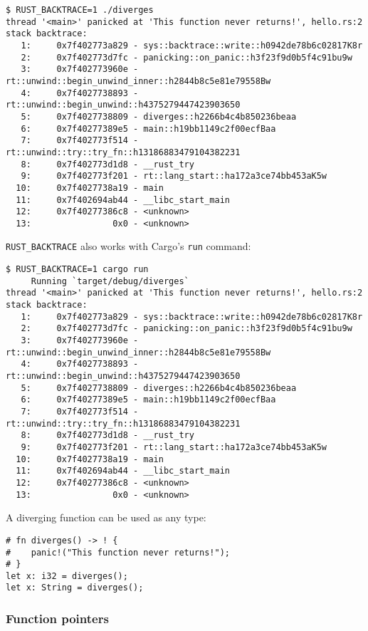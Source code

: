 \documentclass[a4paper,]{book}
\begin{document}
\begin{verbatim}
$ RUST_BACKTRACE=1 ./diverges
thread '<main>' panicked at 'This function never returns!', hello.rs:2
stack backtrace:
   1:     0x7f402773a829 - sys::backtrace::write::h0942de78b6c02817K8r
   2:     0x7f402773d7fc - panicking::on_panic::h3f23f9d0b5f4c91bu9w
   3:     0x7f402773960e - rt::unwind::begin_unwind_inner::h2844b8c5e81e79558Bw
   4:     0x7f4027738893 - rt::unwind::begin_unwind::h4375279447423903650
   5:     0x7f4027738809 - diverges::h2266b4c4b850236beaa
   6:     0x7f40277389e5 - main::h19bb1149c2f00ecfBaa
   7:     0x7f402773f514 - rt::unwind::try::try_fn::h13186883479104382231
   8:     0x7f402773d1d8 - __rust_try
   9:     0x7f402773f201 - rt::lang_start::ha172a3ce74bb453aK5w
  10:     0x7f4027738a19 - main
  11:     0x7f402694ab44 - __libc_start_main
  12:     0x7f40277386c8 - <unknown>
  13:                0x0 - <unknown>
\end{verbatim}

\texttt{RUST\_BACKTRACE} also works with Cargo's \texttt{run} command:

\begin{verbatim}
$ RUST_BACKTRACE=1 cargo run
     Running `target/debug/diverges`
thread '<main>' panicked at 'This function never returns!', hello.rs:2
stack backtrace:
   1:     0x7f402773a829 - sys::backtrace::write::h0942de78b6c02817K8r
   2:     0x7f402773d7fc - panicking::on_panic::h3f23f9d0b5f4c91bu9w
   3:     0x7f402773960e - rt::unwind::begin_unwind_inner::h2844b8c5e81e79558Bw
   4:     0x7f4027738893 - rt::unwind::begin_unwind::h4375279447423903650
   5:     0x7f4027738809 - diverges::h2266b4c4b850236beaa
   6:     0x7f40277389e5 - main::h19bb1149c2f00ecfBaa
   7:     0x7f402773f514 - rt::unwind::try::try_fn::h13186883479104382231
   8:     0x7f402773d1d8 - __rust_try
   9:     0x7f402773f201 - rt::lang_start::ha172a3ce74bb453aK5w
  10:     0x7f4027738a19 - main
  11:     0x7f402694ab44 - __libc_start_main
  12:     0x7f40277386c8 - <unknown>
  13:                0x0 - <unknown>
\end{verbatim}

A diverging function can be used as any type:

\begin{verbatim}
# fn diverges() -> ! {
#    panic!("This function never returns!");
# }
let x: i32 = diverges();
let x: String = diverges();
\end{verbatim}

\subsubsection{Function pointers}\label{function-pointers}
\end{document}
